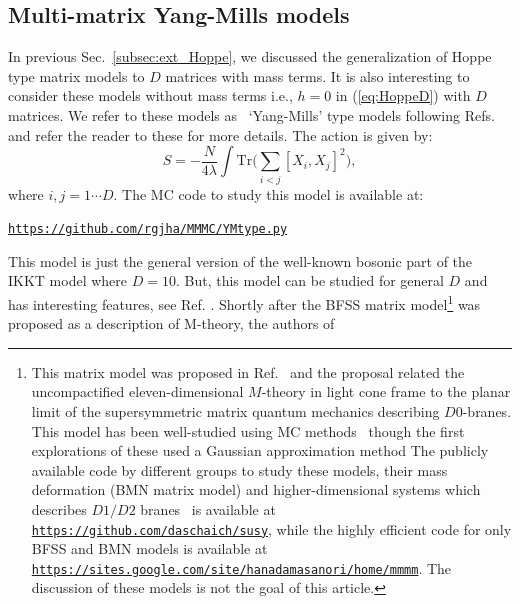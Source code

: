 \documentclass[letter,11pt]{article}
\begin{document}
\subsection{Multi-matrix Yang-Mills models}
In previous Sec.~\ref{subsec:ext_Hoppe}, we discussed the generalization of Hoppe type matrix models to $D$ matrices with mass terms. It is also interesting to consider these models without mass terms i.e., $h=0$ in (\ref{eq:HoppeD}) with $D$ matrices. We refer to these models as ~`Yang-Mills' type models following Refs.~\cite{Krauth:1998yu,Krauth:1999qw} and refer the reader to these for more details. The action is given by: 
\begin{equation}
	\label{eq:CTmodel} 
S = -\frac{N}{4\lambda} \int \mbox{Tr} \Bigg( \sum_{i < j}[X_i, X_j]^{2}\Bigg), 
\end{equation}
where $i, j = 1 \cdots D$. The MC code to study this model is available at:
\begin{center} \texttt{\href{https://github.com/rgjha/MMMC/blob/main/YMtype.py}{https://github.com/rgjha/MMMC/YMtype.py}} \end{center}
This model is just the general version of the well-known bosonic part of the IKKT model where $D=10$. But, this model can be studied for general $D$ and has interesting features, see Ref. \cite{Hotta:1998en}. 
Shortly after the BFSS matrix model\footnote{This matrix model was proposed in Ref.~\cite{Banks:1996vh} and the proposal related the uncompactified eleven-dimensional $M$-theory in light cone frame to the planar limit of the supersymmetric matrix quantum mechanics describing $D0$-branes. This model has been well-studied using MC methods~\cite{Hanada:2007ti, Anagnostopoulos:2007fw, Catterall:2008yz, Hanada:2008ez, Kadoh:2015mka, Filev:2015hia, Berkowitz:2016tyy} though the first explorations of these used a Gaussian approximation method \cite{Kabat:1999hp,Kabat:2000zv}
The publicly available code by different groups 
to study these models, their mass deformation (BMN matrix model) \cite{Dhindsa:2022vch}
and higher-dimensional systems which describes $D1/D2$ branes~\cite{Catterall:2017lub,Jha:2017zad,Catterall:2020nmn}
is available at \texttt{\href{https://github.com/daschaich/susy}{https://github.com/daschaich/susy}}, while the
highly efficient code for only BFSS and BMN models is available at
\texttt{\href{https://sites.google.com/site/hanadamasanori/home/mmmm}
{https://sites.google.com/site/hanadamasanori/home/mmmm}}.
The discussion of these models is not the goal of this article. 
}
was proposed as a description of M-theory, the authors of 
\end{document}
